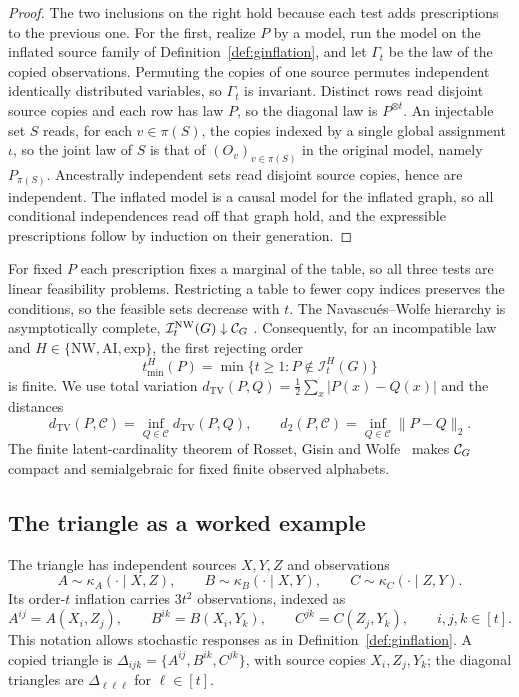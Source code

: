 \documentclass[11pt]{article}
\theoremstyle{plain}
\theoremstyle{definition}
\DeclareMathOperator{\TV}{TV}
\newcommand{\INW}{\mathcal I^{\mathrm{NW}}}
\newcommand{\tmin}{t_{\min}}
\begin{document}
\begin{proof}
The two inclusions on the right hold because each test adds prescriptions to the previous one. For the first, realize $P$ by a model, run the model on the inflated source family of Definition~\ref{def:ginflation}, and let $\Gamma_t$ be the law of the copied observations. Permuting the copies of one source permutes independent identically distributed variables, so $\Gamma_t$ is invariant. Distinct rows read disjoint source copies and each row has law $P$, so the diagonal law is $P^{\otimes t}$. An injectable set $S$ reads, for each $v\in\pi(S)$, the copies indexed by a single global assignment $\iota$, so the joint law of $S$ is that of $(O_v)_{v\in\pi(S)}$ in the original model, namely $P_{\pi(S)}$. Ancestrally independent sets read disjoint source copies, hence are independent. The inflated model is a causal model for the inflated graph, so all conditional independences read off that graph hold, and the expressible prescriptions follow by induction on their generation.
\end{proof}


For fixed $P$ each prescription fixes a marginal of the table, so all three tests are linear feasibility problems. Restricting a table to fewer copy indices preserves the conditions, so the feasible sets decrease with $t$. The Navascués--Wolfe hierarchy is asymptotically complete, $\INW_t(G)\downarrow\Cscen{G}$ \cite{NW2020}. Consequently, for an incompatible law and $H\in\{\mathrm{NW},\mathrm{AI},\mathrm{exp}\}$, the first rejecting order
\[
\tmin^H(P)=\min\{t\ge1:P\notin\mathcal I_t^H(G)\}
\]
is finite. We use total variation $d_{\TV}(P,Q)=\tfrac12\sum_x|P(x)-Q(x)|$ and the distances
\[
d_{\TV}(P,\mathcal C)=\inf_{Q\in\mathcal C}d_{\TV}(P,Q),\qquad
d_2(P,\mathcal C)=\inf_{Q\in\mathcal C}\|P-Q\|_2.
\]
The finite latent-cardinality theorem of Rosset, Gisin and Wolfe~\cite{RGW2018} makes $\mathcal C_{G}$ compact and semialgebraic for fixed finite observed alphabets.

\subsection{The triangle as a worked example}\label{sec:triangle}

The triangle has independent sources $X,Y,Z$ and observations
\[
A\sim\kappa_A(\cdot\mid X,Z),\qquad
B\sim\kappa_B(\cdot\mid X,Y),\qquad
C\sim\kappa_C(\cdot\mid Z,Y).
\]
Its order-$t$ inflation carries $3t^2$ observations, indexed as
\[
A^{ij}=A(X_i,Z_j),\qquad B^{ik}=B(X_i,Y_k),\qquad C^{jk}=C(Z_j,Y_k),\qquad i,j,k\in[t].
\]
This notation allows stochastic responses as in Definition~\ref{def:ginflation}. A copied triangle is $\Delta_{ijk}=\{A^{ij},B^{ik},C^{jk}\}$, with source copies $X_i,Z_j,Y_k$; the diagonal triangles are $\Delta_{\ell\ell\ell}$ for $\ell\in[t]$.
\end{document}
